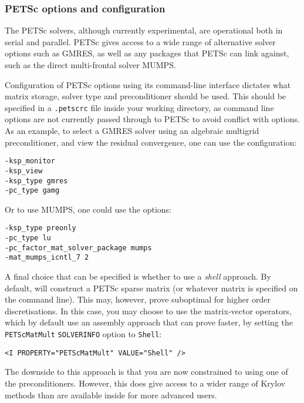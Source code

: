 \subsubsection{PETSc options and configuration}
\label{sec:petsc}

The PETSc solvers, although currently experimental, are operational both in
serial and parallel. PETSc gives access to a wide range of alternative solver
options such as GMRES, as well as any packages that PETSc can link against, such
as the direct multi-frontal solver MUMPS.

Configuration of PETSc options using its command-line interface dictates what
matrix storage, solver type and preconditioner should be used. This should be
specified in a \texttt{.petscrc} file inside your working directory, as command
line options are not currently passed through to PETSc to avoid conflict with
\nekpp options. As an example, to select a GMRES solver using an algebraic
multigrid preconditioner, and view the residual convergence, one can use the
configuration:

\begin{lstlisting}[style=BashInputStyle]
-ksp_monitor
-ksp_view
-ksp_type gmres
-pc_type gamg
\end{lstlisting}

Or to use MUMPS, one could use the options:

\begin{lstlisting}[style=BashInputStyle]
-ksp_type preonly
-pc_type lu
-pc_factor_mat_solver_package mumps
-mat_mumps_icntl_7 2
\end{lstlisting}

A final choice that can be specified is whether to use a \emph{shell}
approach. By default, \nekpp will construct a PETSc sparse matrix (or whatever
matrix is specified on the command line). This may, however, prove suboptimal
for higher order discretisations. In this case, you may choose to use the \nekpp
matrix-vector operators, which by default use an assembly approach that can
prove faster, by setting the \texttt{PETScMatMult} \texttt{SOLVERINFO} option to
\texttt{Shell}:

\begin{lstlisting}[style=XMLStyle]
<I PROPERTY="PETScMatMult" VALUE="Shell" />
\end{lstlisting}

The downside to this approach is that you are now constrained to using one of
the \nekpp preconditioners. However, this does give access to a wider range of
Krylov methods than are available inside \nekpp for more advanced users.

